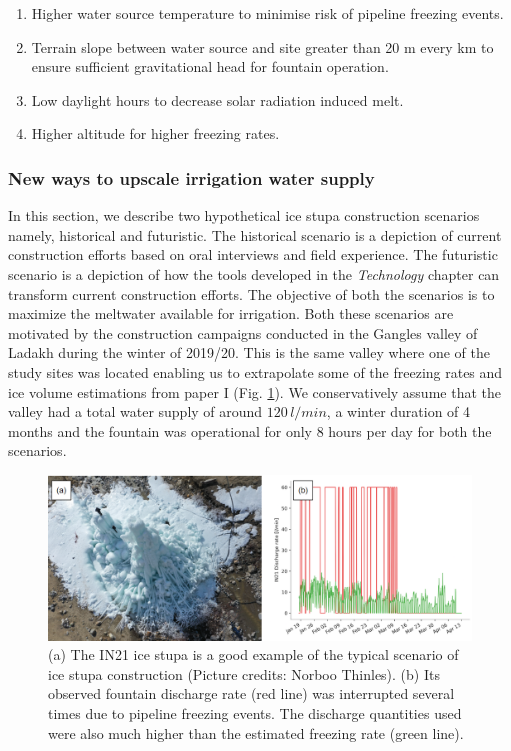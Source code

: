 \begin{enumerate}
	\item Higher water source temperature to minimise risk of pipeline freezing events.
	\item Terrain slope between water source and site greater than 20 m every km to ensure sufficient
    gravitational head for fountain operation.
	\item Low daylight hours to decrease solar radiation induced melt.
	\item Higher altitude for higher freezing rates.
\end{enumerate}

\subsubsection{New ways to upscale irrigation water supply}

In this section, we describe two hypothetical ice stupa construction scenarios namely, historical and
futuristic. The historical scenario is a depiction of current construction efforts based on oral interviews and
field experience. The futuristic scenario is a depiction of how the tools developed in the \textit{Technology}
chapter can transform current construction efforts. The objective of both the scenarios is to maximize the
meltwater available for irrigation. Both these scenarios are motivated by the construction campaigns conducted
in the Gangles valley of Ladakh during the winter of 2019/20. This is the same valley where one of the study
sites was located enabling us to extrapolate some of the freezing rates and ice volume estimations from paper I
(Fig. \ref{fig:gangles_data}). We conservatively assume that the valley had a total water supply of around
$120\,l/min$, a winter duration of 4 months and the fountain was operational for only 8 hours per day for both
the scenarios. 

\begin{figure}[htb]
	\includegraphics[width=\textwidth]{figs/gangles_data}

  \caption{(a) The IN21 ice stupa is a good example of the typical scenario of ice stupa construction (Picture
  credits: Norboo Thinles). (b) Its observed fountain discharge rate (red line) was interrupted several times
  due to pipeline freezing events. The discharge quantities used were also much higher than the estimated
  freezing rate (green line). }

	\label{fig:gangles_data}
\end{figure}

